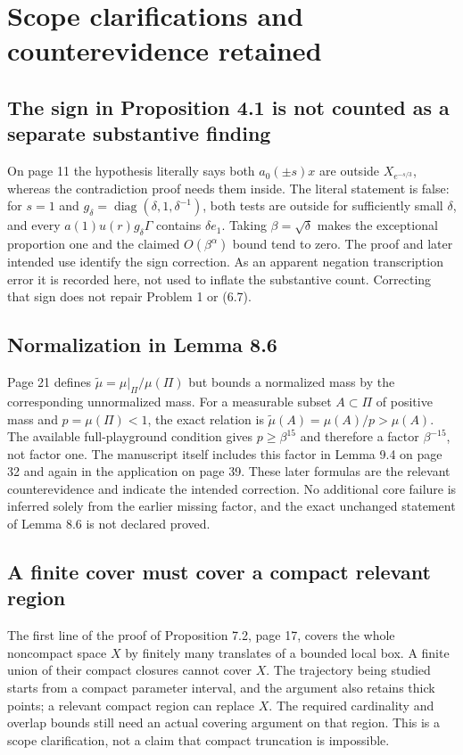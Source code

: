\documentclass[10pt]{article}
\begin{document}
\section*{Scope clarifications and counterevidence retained}
\subsection*{The sign in Proposition 4.1 is not counted as a separate substantive finding}
On page 11 the hypothesis literally says both \(a_0(\pm s)x\) are outside \(X_{e^{-s/3}}\), whereas the contradiction proof needs them inside. The literal statement is false: for \(s=1\) and \(g_\delta=\operatorname{diag}(\delta,1,\delta^{-1})\), both tests are outside for sufficiently small \(\delta\), and every \(a(1)u(r)g_\delta\Gamma\) contains \(\delta e_1\). Taking \(\beta=\sqrt\delta\) makes the exceptional proportion one and the claimed \(O(\beta^\alpha)\) bound tend to zero. The proof and later intended use identify the sign correction. As an apparent negation transcription error it is recorded here, not used to inflate the substantive count. Correcting that sign does not repair Problem 1 or (6.7).\par
\subsection*{Normalization in Lemma 8.6}
Page 21 defines \(\widetilde\mu=\mu|_{\Pi}/\mu(\Pi)\) but bounds a normalized mass by the corresponding unnormalized mass. For a measurable subset \(A\subset\Pi\) of positive mass and \(p=\mu(\Pi)<1\), the exact relation is \(\widetilde\mu(A)=\mu(A)/p>\mu(A)\). The available full-playground condition gives \(p\geq\beta^{15}\) and therefore a factor \(\beta^{-15}\), not factor one. The manuscript itself includes this factor in Lemma 9.4 on page 32 and again in the application on page 39. These later formulas are the relevant counterevidence and indicate the intended correction. No additional core failure is inferred solely from the earlier missing factor, and the exact unchanged statement of Lemma 8.6 is not declared proved.\par
\subsection*{A finite cover must cover a compact relevant region}
The first line of the proof of Proposition 7.2, page 17, covers the whole noncompact space \(X\) by finitely many translates of a bounded local box. A finite union of their compact closures cannot cover \(X\). The trajectory being studied starts from a compact parameter interval, and the argument also retains thick points; a relevant compact region can replace \(X\). The required cardinality and overlap bounds still need an actual covering argument on that region. This is a scope clarification, not a claim that compact truncation is impossible.\par
\end{document}
